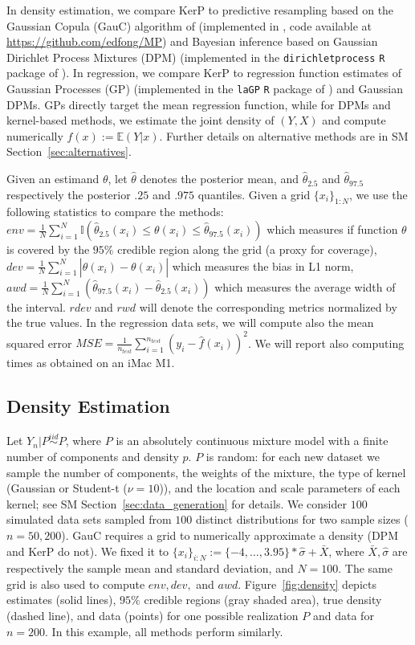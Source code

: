 \documentclass{article}
\theoremstyle{definition}
\newcommand{\iidsim}{\overset{iid}{\sim}} %
\renewcommand{\&}{and}
\begin{document}
In density estimation, we compare KerP to predictive resampling based on the Gaussian Copula (GauC) algorithm of \cite{hahn18} (implemented in \cite{fong2021martingale}, code available at \url{https://github.com/edfong/MP}) and Bayesian inference based on Gaussian Dirichlet Process Mixtures (DPM) (implemented in the \texttt{dirichletprocess} \texttt{R} package of \cite{ross2018dirichletprocess}). In regression, we compare KerP to regression function estimates of Gaussian Processes (GP) (implemented in the \texttt{laGP} \texttt{R} package of \cite{gramacy2016lagp}) and Gaussian DPMs. GPs directly target the mean regression function, while for DPMs and kernel-based methods, we estimate the joint density of $(Y, X)$ and compute numerically $f(x):=\mathbb{E}(Y|x)$. Further details on alternative methods are in SM Section~\ref{sec:alternatives}.

Given an estimand $\theta$, let $\hat{\theta}$ denotes the posterior mean, and $\hat{\theta}_{2.5}$ and $\hat{\theta}_{97.5}$ respectively the posterior $.25$ and $.975$ quantiles. Given a grid $\{x_i\}_{1:N}$, we use the following statistics to compare the methods:  $env=\frac{1}{N} \sum_{i=1}^N\mathbb{I} (\hat{\theta}_{2.5}(x_i) \leq \theta(x_i) \leq \hat{\theta}_{97.5}(x_i))$ which measures if function $\theta$ is covered by the $95\%$ credible region along the grid (a proxy for coverage), $dev=\frac{1}{N} \sum_{i=1}^N| \hat{\theta}(x_i)-\theta(x_i)|$ which measures the bias in L1 norm, $awd=\frac{1}{N} \sum_{i=1}^N(\hat{\theta}_{97.5}(x_i)-\hat{\theta}_{2.5}(x_i))$ which measures the average width of the interval. $rdev$ and $rwd$ will denote the corresponding metrics normalized by the true values. In the regression data sets, we will compute also the mean squared error $MSE=\frac{1}{n_{test}} \sum_{i=1}^{n_{test}} (y_i -\hat{f}(x_i))^2$. We will report also computing times as obtained on an iMac M1.


\subsection{Density Estimation}\label{sec:ill_density}

Let $Y_n | P \iidsim P$, where $P$ is an absolutely continuous mixture model with a finite number of components and density $p$. $P$ is random: for each new dataset we sample the number of components, the weights of the mixture, the type of kernel (Gaussian or Student-t ($\nu=10$)), and the location and scale parameters of each kernel; see SM Section~\ref{sec:data_generation} for details.  We consider $100$ simulated data sets sampled from $100$ distinct distributions for two sample sizes ($n=50,200$). GauC requires a grid to numerically approximate a density (DPM and KerP do not). We fixed it to $\{x_i\}_{i:N}:=\{-4,\ldots, 3.95\}*\hat{\sigma} + \bar{X}$, where $\bar{X}, \hat{\sigma}$ are respectively the sample mean and standard deviation, and $N=100$. The same grid is also used to compute $env,dev,$ and $awd$. Figure~\ref{fig:density} depicts estimates (solid lines), $95\%$ credible regions (gray shaded area), true density (dashed line), and data (points) for one possible realization $P$ and data for $n=200$. In this example, all methods perform similarly. 
\end{document}
